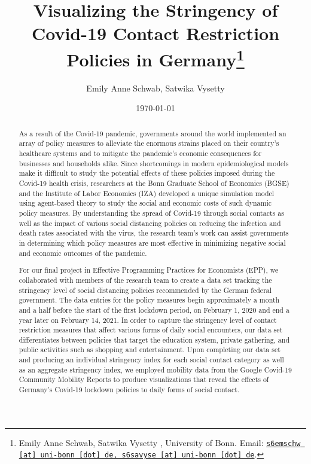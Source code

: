 \documentclass[11pt, a4paper, leqno]{article}
\begin{document}
\title{Visualizing the Stringency of Covid-19 Contact Restriction Policies in Germany\thanks{Emily Anne Schwab, Satwika Vysetty , University of Bonn. Email: \href{mailto:s6emschw@uni-bonn.de, s6savyse@uni-bonn.de}{\nolinkurl{s6emschw [at] uni-bonn [dot] de, s6savyse [at] uni-bonn [dot] de}}.}}

\author{Emily Anne Schwab, Satwika Vysetty}

\date{
    \today
}

\maketitle


\clearpage

\begin{abstract}
\noindent As a result of the Covid-19 pandemic, governments around the world implemented an array of policy measures to alleviate the enormous strains placed on their country’s healthcare systems and to mitigate the pandemic’s economic consequences for businesses and households alike. Since shortcomings in modern epidemiological models make it difficult to study the potential effects of these policies imposed during the Covid-19 health crisis, researchers at the Bonn Graduate School of Economics (BGSE) and the Institute of Labor Economics (IZA) developed a unique simulation model using agent-based theory to study the social and economic costs of such dynamic policy measures. By understanding the spread of Covid-19 through social contacts as well as the impact of various social distancing policies on reducing the infection and death rates associated with the virus, the research team’s work can assist governments in determining which policy measures are most effective in minimizing negative social and economic outcomes of the pandemic.

\vspace{6pt}

\noindent For our final project in Effective Programming Practices for Economists (EPP), we collaborated with members of the research team to create a data set tracking the stringency level of social distancing policies recommended by the German federal government. The data entries for the policy measures begin approximately a month and a half before the start of the first lockdown period, on February 1, 2020 and end a year later on February 14, 2021. In order to capture the stringency level of contact restriction measures that affect various forms of daily social encounters, our data set differentiates between policies that target the education system, private gathering, and public activities such as shopping and entertainment. Upon completing our data set and producing an individual stringency index for each social contact category as well as an aggregate stringency index, we employed mobility data from the Google Covid-19 Community Mobility Reports to produce visualizations that reveal the effects of Germany’s Covid-19 lockdown policies to daily forms of social contact.
\end{abstract}
\clearpage
\end{document}
